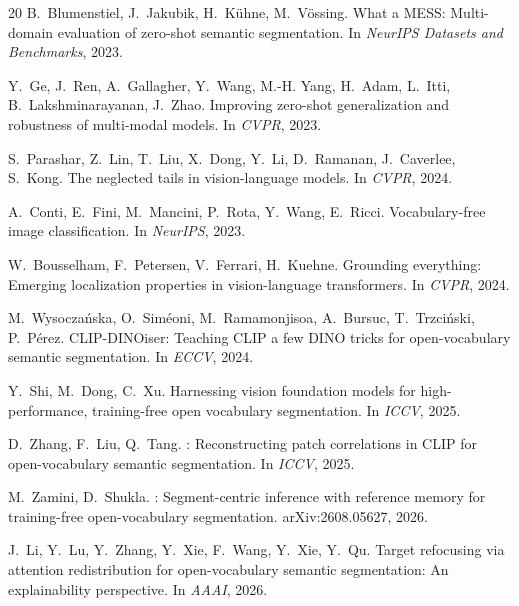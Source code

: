 \documentclass[11pt]{article}
\begin{document}
\begin{thebibliography}{20}
B.~Blumenstiel, J.~Jakubik, H.~K\"uhne, M.~V\"ossing.
\newblock What a MESS: Multi-domain evaluation of zero-shot semantic segmentation.
\newblock In \emph{NeurIPS Datasets and Benchmarks}, 2023.

Y.~Ge, J.~Ren, A.~Gallagher, Y.~Wang, M.-H. Yang, H.~Adam, L.~Itti, B.~Lakshminarayanan, J.~Zhao.
\newblock Improving zero-shot generalization and robustness of multi-modal models.
\newblock In \emph{CVPR}, 2023.

S.~Parashar, Z.~Lin, T.~Liu, X.~Dong, Y.~Li, D.~Ramanan, J.~Caverlee, S.~Kong.
\newblock The neglected tails in vision-language models.
\newblock In \emph{CVPR}, 2024.

A.~Conti, E.~Fini, M.~Mancini, P.~Rota, Y.~Wang, E.~Ricci.
\newblock Vocabulary-free image classification.
\newblock In \emph{NeurIPS}, 2023.

W.~Bousselham, F.~Petersen, V.~Ferrari, H.~Kuehne.
\newblock Grounding everything: Emerging localization properties in vision-language transformers.
\newblock In \emph{CVPR}, 2024.

M.~Wysocza\'nska, O.~Sim\'eoni, M.~Ramamonjisoa, A.~Bursuc, T.~Trzci\'nski, P.~P\'erez.
\newblock CLIP-DINOiser: Teaching CLIP a few DINO tricks for open-vocabulary semantic segmentation.
\newblock In \emph{ECCV}, 2024.

Y.~Shi, M.~Dong, C.~Xu.
\newblock Harnessing vision foundation models for high-performance, training-free
  open vocabulary segmentation.
\newblock In \emph{ICCV}, 2025.

D.~Zhang, F.~Liu, Q.~Tang.
: Reconstructing patch correlations in {CLIP} for
  open-vocabulary semantic segmentation.
\newblock In \emph{ICCV}, 2025.

M.~Zamini, D.~Shukla.
: Segment-centric inference with reference memory for
  training-free open-vocabulary segmentation.
\newblock arXiv:2608.05627, 2026.

J.~Li, Y.~Lu, Y.~Zhang, Y.~Xie, F.~Wang, Y.~Xie, Y.~Qu.
\newblock Target refocusing via attention redistribution for open-vocabulary
  semantic segmentation: An explainability perspective.
\newblock In \emph{AAAI}, 2026.


\end{thebibliography}
\end{document}
